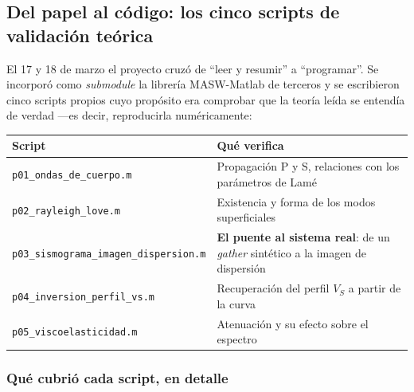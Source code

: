 
\subsection{Del papel al c\'odigo: los cinco scripts de validaci\'on te\'orica}

El 17 y 18 de marzo el proyecto cruz\'o de ``leer y resumir'' a ``programar''.
Se incorpor\'o como \emph{submodule} la librer\'ia MASW-Matlab de terceros y se
escribieron cinco scripts propios cuyo prop\'osito era comprobar que la teor\'ia
le\'ida se entend\'ia de verdad ---es decir, reproducirla num\'ericamente:

\begin{center}\small
\begin{tabularx}{\textwidth}{@{}l X@{}}
\toprule
\textbf{Script} & \textbf{Qu\'e verifica} \\
\midrule
\texttt{p01\_ondas\_de\_cuerpo.m} & Propagaci\'on P y S, relaciones con los par\'ametros de Lam\'e \\
\texttt{p02\_rayleigh\_love.m} & Existencia y forma de los modos superficiales \\
\texttt{p03\_sismograma\_imagen\_dispersion.m} & \textbf{El puente al sistema real}: de un \emph{gather} sint\'etico a la imagen de dispersi\'on \\
\texttt{p04\_inversion\_perfil\_vs.m} & Recuperaci\'on del perfil $V_S$ a partir de la curva \\
\texttt{p05\_viscoelasticidad.m} & Atenuaci\'on y su efecto sobre el espectro \\
\bottomrule
\end{tabularx}
\end{center}


\subsubsection{Qu\'e cubri\'o cada script, en detalle}

